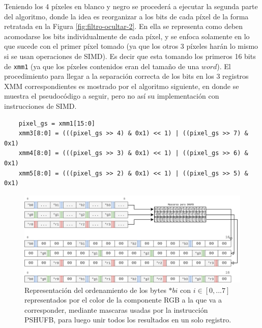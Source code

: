 \documentclass[a4paper]{article}
\newenvironment{codesnippet}{%
	\begin{Sbox}\begin{minipage}{\textwidth}\sffamily\small}%
	{\end{minipage}\end{Sbox}%
		\begin{center}%
		\vspace{-0.4cm}\colorbox{litegrey}{\TheSbox}\end{center}\vspace{0.3cm}}
\begin{document}
Teniendo los 4 píxeles en blanco y negro se procederá a ejecutar la segunda parte del algoritmo, donde la idea es reorganizar a los bits de cada píxel de la forma retratada en la Figura \ref{fig:filtro-ocultar-2}.
En ella se representa como deben acomodarse los bits individualmente de cada píxel, y se enfoca solamente en lo que sucede con el primer píxel tomado (ya que los otros 3 píxeles harán lo mismo si se usan operaciones de SIMD). Es decir que esta tomando los primeros 16 bits de \texttt{xmm1} (ya que los píxeles contenidos eran del tamaño de una $word$). El procedimiento para llegar a la separación correcta de los bits en los 3 registros XMM correspondientes es mostrado por el algoritmo siguiente, en donde se muestra el pseudocódigo a seguir, pero no así su implementación con instrucciones de SIMD.

\begin{codesnippet}
\begin{verbatim}
    pixel_gs = xmm1[15:0]
    xmm3[8:0] = (((pixel_gs >> 4) & 0x1) << 1) | ((pixel_gs >> 7) & 0x1)
    xmm4[8:0] = (((pixel_gs >> 3) & 0x1) << 1) | ((pixel_gs >> 6) & 0x1)
    xmm5[8:0] = (((pixel_gs >> 2) & 0x1) << 1) | ((pixel_gs >> 5) & 0x1)
\end{verbatim}
\end{codesnippet}

\begin{figure}[h]
  \begin{center}
	\includegraphics[scale=0.33]{images/filtro-ocultar-3.png}
	\caption{Representación del ordenamiento de los bytes $*bi$ con $i \in [0,...7]$ representados por el color de la componente RGB a la que va a corresponder, mediante mascaras usadas por la instrucción PSHUFB, para luego unir todos los resultados en un solo registro.}
	\label{fig:filtro-ocultar-3}
  \end{center}
\end{figure}
\end{document}
